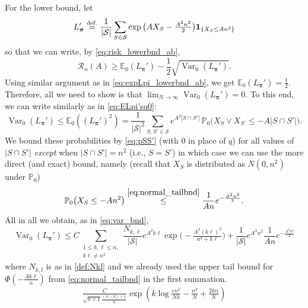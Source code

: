 \documentclass[11pt,reqno,letterpaper]{amsart}
\numberwithin{equation}{section}
\theoremstyle{plain}
\def \bpi{\boldsymbol{\pi}}
\def \E{\mathbb{E}}
\def \P{\mathbb{P}}
\providecommand{\var}{\operatorname{Var}}
\begin{document}
\smallskip

 For the lower bound, let
\begin{equation*}%
L_{\bpi}' \stackrel{{\rm def.}}{=} \frac1{|\mathcal S|} \sum_{S \in \mathcal S} \exp\big(A X_S - \tfrac{A^2n^2}{2}\big) \mathbf{1}_{\{X_{S} \le An^2\}}
\end{equation*}
so that we can write, by \eqref{eq:risk_lowerbnd_ab},
\begin{equation*}%
\mathcal R_n(A) \ge \E_0(L_{\bpi}') - \frac12\sqrt{\var_0(L_{\bpi}')}.
\end{equation*}
Using similar argument as in \eqref{eq:expLpi_lowerbnd_ab}, we get $\E_0(L_{\bpi}') = 
\frac 12$. Therefore, all we need to show is that $\lim_{N \to \infty} \var_0(L_{\bpi}') = 0$. To this end, we can write similarly as in \eqref{eq:ELpi'sq0}:
\begin{equation*}%
\var_0(L_{\bpi}') \le \E_0((L_{\bpi}')^2) 
= \frac 1{|\mathcal S|^2} \sum_{S, S' \in \mathcal S} e^{A^2|S \cap S'|} \, \P_0 \big( X_{S} \vee X_{S'} \le  - A|S \cap S'| \big).
\end{equation*}
We bound these probabilities by \eqref{eq:pSS'} (with $0$ in place of $q$) for 
all values of $|S \cap S'|$ {\em except} when $|S \cap S'| = n^2$ (i.e., $S = S'$) in 
which case we can use the more direct (and exact) bound, namely (recall that $X_S$ is 
distributed as $N(0, n^2)$ under $\P_0$)
\begin{equation*}
\P_0 \big(X_{S} \le  - An^2 \big) \stackrel{\eqref{eq:normal_tailbnd}}{\le} \frac 1{An} e^{-\frac{A^2n^2}2}.
\end{equation*}
All in all we obtain, as in \eqref{eq:var_bnd},
\begin{equation*}%
\var_0(L_{\bpi}') \le C \sum_{\substack{1 \le k, \ell \le n,\\ k\ell \ne n^2}} \frac{N_{k, \ell}}{|\mathcal S|} e^{A^2k\ell} \exp\big(- \tfrac{A^2(k\ell)^2}{n^2 + k\ell}\big) + \frac1{|\mathcal S|} e^{A^2 n^2} \frac 1{An} e^{-\frac{A^2n^2}2}
\end{equation*}
where $N_{k, l}$ is as in \eqref{def:Nkl} and we already used the upper tail bound for $\Phi(-\tfrac{A k\ell}n)$ from \eqref{eq:normal_tailbnd} in the first 
summation. 
\begin{equation*}
\tfrac{C}{\sqrt{k \vee 1}\frac {(n-k)\vee1} n}\exp(k\log \tfrac {en^2}{Nk} -\tfrac{n^2}N + \tfrac{2kn}N)    
\end{equation*}
\end{document}
